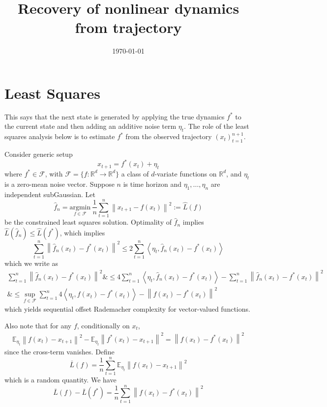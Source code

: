 \documentclass[11pt]{article}
\title{Recovery of nonlinear dynamics from trajectory}
\author{}
\date{\today}
\newcommand{\inner}[1]{\left\langle #1 \right\rangle}
\newcommand{\E}{\ensuremath{\mathbb E}}
\newcommand{\F}{\ensuremath{\mathcal F}}
\newcommand{\mrm}[1]{\mathrm{#1}}
\newcommand{\reals}{\ensuremath{\mathbb R}}
\newcommand{\En}{\E}
\newcommand{\emploss}{\widehat{L}}
\newcommand{\condemploss}{\bar{L}}
\newcommand{\norm}[1]{\left\|#1\right\|}
\newcommand{\argmin}[1]{\underset{#1}{\mrm{argmin}} \ }
\newcommand{\algo}{\widehat{f}_n}
\begin{document}
\maketitle

\begin{abstract}
\end{abstract}


\section{Least Squares}
%
This says that the next state is generated by applying the true dynamics \(f^*\) to the current state and then adding an additive noise term \(\eta_t\).
The role of the least squares analysis below is to estimate \(f^*\) from the observed trajectory \((x_t)_{t=1}^{n+1}\).






Consider generic setup
$$x_{t+1} = f^*(x_t) + \eta_t$$
where $f^*\in \F$, with $\F=\{f:\reals^d\to \reals^d\}$ a class of $d$-variate functions on $\reals^d$, and $\eta_t$ is a zero-mean noise vector. Suppose $n$ is time horizon and $\eta_1,\ldots,\eta_n$ are independent subGaussian. Let
$$\algo = \argmin{f\in\F} \frac{1}{n}\sum_{t=1}^n \norm{x_{t+1}-f(x_t)}^2 := \emploss(f)$$ 
be the constrained least squares solution. Optimality of $\algo$ implies
$\emploss(\algo)\leq \emploss(f^*)$, which implies
$$\sum_{t=1}^n \norm{\algo(x_t)-f^*(x_t)}^2 \leq 2\sum_{t=1}^n \inner{\eta_t, \algo(x_t)-f^*(x_t)}$$
which we write as
\begin{align}
	\sum_{t=1}^n \norm{\algo(x_t)-f^*(x_t)}^2 \&\leq 4\sum_{t=1}^n \inner{\eta_t, \algo(x_t)-f^*(x_t)} - \sum_{t=1}^n \norm{\algo(x_t)-f^*(x_t)}^2 \\
	\&\leq \sup_{f\in\F } \sum_{t=1}^n 4\inner{\eta_t, f(x_t)-f^*(x_t)} - \norm{f(x_t)-f^*(x_t)}^2
\end{align}
which yields sequential offset Rademacher complexity for vector-valued functions.

Also note that for any $f$, conditionally on $x_t$,
\begin{align}
	\En_{\eta_t}\norm{f(x_t)-x_{t+1}}^2 - \En_{\eta_t}\norm{f^*(x_t)-x_{t+1}}^2 = \norm{f(x_t)-f^*(x_t)}^2
\end{align}
since the cross-term vanishes. Define
$$\condemploss(f) = \frac{1}{n}\sum_{t=1}^n \En_{\eta_t}\norm{f(x_t)-x_{t+1}}^2$$
which is a random quantity. We have
$$\condemploss(f) - \condemploss(f^*) = \frac{1}{n}\sum_{t=1}^n \norm{f(x_t)-f^*(x_t)}^2$$
\end{document}
